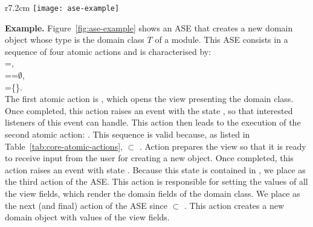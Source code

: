 {\makeatletter
	\let\par\@@par
	\par{}
	\everypar{}
\begin{wrapfigure}{r}{7.2cm}
	\centering
	\vspace{-3.2cm}
	\texttt{[image: ase-example]}
\vspace{-0.1cm}
	\caption{An ASE to create a domain object (typed $T$).} %
\vspace{-0.3cm}
	\label{fig:ase-example}
\end{wrapfigure}

\noindent\textbf{Example.} Figure~\ref{fig:ase-example} shows an ASE that creates a new domain object whose type is the domain class $T$ of a module. This ASE consists in a sequence of four atomic actions and is characterised by:\\ =,\\
==$\emptyset$,\\
=\{\}.\\
%
The first atomic action is , which opens the view presenting the domain class. Once completed, this action raises an event with the state , so that interested listeners of this event can handle. This action then leads to the execution of the second atomic action: . This sequence is valid because, as listed in Table~\ref{tab:core-atomic-actions},  $\subset$ . Action  prepares the view so that it is ready to receive input from the user for creating a new object. Once completed, this action raises an event with state .
%
Because this state is contained in , we place  as the third action of the ASE. This action is responsible for setting the values of all the view fields, which render the domain fields of the domain class. We place  as the next (and final) action of the ASE since  $\subset$ . This action creates a new domain object with values of the view fields.

}
